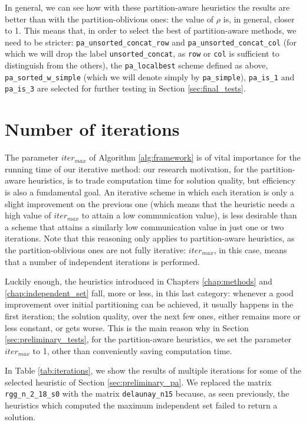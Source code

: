 In general, we can see how with these partition-aware heuristics the results are better than with the partition-oblivious ones: the value of $\rho$ is, in general, closer to 1. This means that, in order to select the best of partition-aware methods, we need to be stricter: \verb|pa_unsorted_concat_row| and \verb|pa_unsorted_concat_col| (for which we will drop the label \verb|unsorted_concat|, as \verb|row| or \verb|col| is sufficient to distinguish from the others), the \verb|pa_localbest| scheme defined as above, \verb|pa_sorted_w_simple| (which we will denote simply by \verb|pa_simple|), \verb|pa_is_1| and \verb|pa_is_3| are selected for further testing in Section \ref{sec:final_tests}.

\section{Number of iterations} \label{sec:iter_max}

The parameter $iter_{max}$ of Algorithm \ref{alg:framework} is of vital importance for the running time of our iterative method: our research motivation, for the partition-aware heuristics, is to trade computation time for solution quality, but efficiency is also a fundamental goal. An iterative scheme in which each iteration is only a slight improvement on the previous one (which means that the heuristic needs a high value of $iter_{max}$ to attain a low communication value), is less desirable than a scheme that attains a similarly low communication value in just one or two iterations. Note that this reasoning only applies to partition-aware heuristics, as the partition-oblivious ones are not fully iterative: $iter_{max}$, in this case, means that a number of independent iterations is performed.

Luckily enough, the heuristics introduced in Chapters \ref{chap:methods} and \ref{chap:independent_set} fall, more or less, in this last category: whenever a good improvement over initial partitioning can be achieved, it usually happens in the first iteration; the solution quality, over the next few ones, either remains more or less constant, or gets worse. This is the main reason why in Section \ref{sec:preliminary_tests}, for the partition-aware heuristics, we set the parameter $iter_{max}$ to 1, other than conveniently saving computation time.

In Table \ref{tab:iterations}, we show the results of multiple iterations for some of the selected heuristic of Section \ref{sec:preliminary_pa}. We replaced the matrix \verb|rgg_n_2_18_s0| with the matrix \verb|delaunay_n15| because, as seen previously, the heuristics which computed the maximum independent set failed to return a solution.

